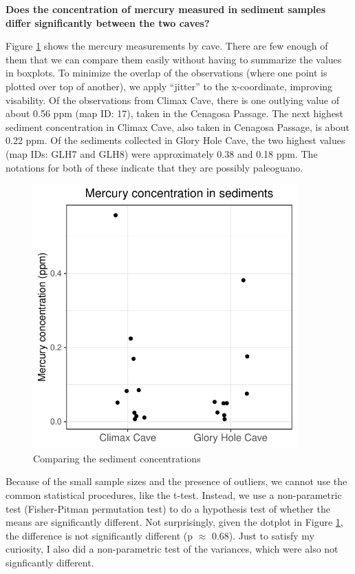 \documentclass[11pt]{article}
\begin{document}
\noindent \textbf{Does the concentration of mercury measured in
  sediment samples differ significantly between the two caves?}

Figure \ref{fig:dotplot_compare_sediment} shows the mercury
measurements by cave.  There are few enough of them that we can
compare them easily without having to summarize the values in
boxplots.  To minimize the overlap of the observations (where one
point is plotted over top of another), we apply ``jitter'' to the
x-coordinate, improving visability.  Of the observations from Climax
Cave, there is one outlying value of about 0.56 ppm (map ID: 17),
taken in the Cenagosa Passage.  The next highest sediment
concentration in Climax Cave, also taken in Cenagosa Passage, is about
0.22 ppm.  Of the sediments collected in Glory Hole Cave, the two
highest values (map IDs: GLH7 and GLH8) were approximately 0.38 and
0.18 ppm.  The notations for both of these indicate that they are
possibly paleoguano.
\begin{figure}[hb]
  \centering
  \includegraphics[height=4.0in]{dotplot_compare_sediment}
  \caption{Comparing the sediment concentrations}
  \label{fig:dotplot_compare_sediment}
\end{figure}

Because of the small sample sizes and the presence of outliers, we
cannot use the common statistical procedures, like the t-test.
Instead, we use a non-parametric test (Fisher-Pitman permutation test)
to do a hypothesis test of whether the means are significantly
different.  Not surprisingly, given the dotplot in Figure
\ref{fig:dotplot_compare_sediment}, the difference is not
significantly different (p $\approx$ 0.68).  Just to satisfy my
curiosity, I also did a non-parametric test of the variances, which
were also not signficantly different.
\end{document}
